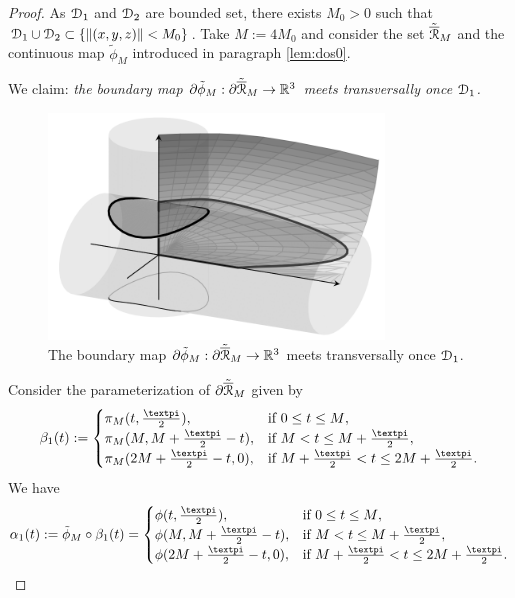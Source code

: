 \documentclass[10pt,twoside]{homg3} %
\newcommand{\proy}{\pi}
\newcommand{\Dd}{{\EuScript D}}
\newcommand{\Rr}{{\EuScript R}}
\renewcommand{\R}{\mathbb{R}}
\begin{document}
\vspace{2mm}
\noindent\begin{proof} 
As $\Dd_1$ and $\Dd_2$ are bounded set, there exists $M_0>0$ such that $\Dd_1\cup\Dd_2\subset\{\|(x,y,z)\|<M_0\}$. Take $M:=4M_0$ and consider the set $\tilde{\overline{\Rr}}_M$ and the continuous map $\tilde{\phi}_M$ introduced in paragraph \ref{lem:dos0}.

\vspace{2mm}
We claim: \em the boundary map $\partial\tilde{\phi}_M:\partial\tilde{\overline{\Rr}}_M\rightarrow\R^3$ meets transversally once $\Dd_1$\em.

\begin{figure}[!ht]
\begin{center}
\includegraphics[height=6cm]{dibmont_B2.png}
\end{center}
\caption{The boundary map $\partial\tilde{\phi}_M:\partial\tilde{\overline{\Rr}}_M\rightarrow\R^3$ meets transversally once $\Dd_1$.}
\end{figure}

Consider the parameterization of $\partial\tilde{\overline{\Rr}}_M$ given by
$$
\beta_1(t):=
\begin{cases}
\proy_M(t,\frac{\text{\textpi}}{2}),&\text{if $0\le t\le M$},\\
\proy_M(M,M+\frac{\text{\textpi}}{2}-t),&\text{if $M<t\le M+\frac{\text{\textpi}}{2}$},\\
\proy_M(2M+\frac{\text{\textpi}}{2}-t,0),&\text{if $M+\frac{\text{\textpi}}{2}<t\le 2M+\frac{\text{\textpi}}{2}$}.
\end{cases}
$$ 
We have 
$$
\alpha_1(t):=\tilde{\phi}_M\circ\beta_1(t)=\begin{cases}
\phi(t,\frac{\text{\textpi}}{2}),&\text{if $0\le t\le M$},\\
\phi(M,M+\frac{\text{\textpi}}{2}-t),&\text{if $M<t\le M+\frac{\text{\textpi}}{2}$},\\
\phi(2M+\frac{\text{\textpi}}{2}-t,0),&\text{if $M+\frac{\text{\textpi}}{2}<t\le 2M+\frac{\text{\textpi}}{2}$}.
\end{cases}
$$ 


\end{proof}
\end{document}
